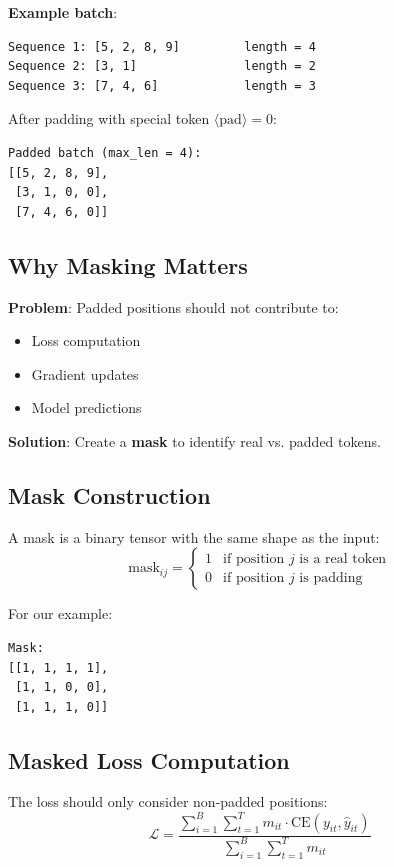 \documentclass{article}
\begin{document}
\textbf{Example batch}:
\begin{verbatim}
Sequence 1: [5, 2, 8, 9]         length = 4
Sequence 2: [3, 1]               length = 2
Sequence 3: [7, 4, 6]            length = 3
\end{verbatim}

After padding with special token $\langle \text{pad} \rangle = 0$:
\begin{verbatim}
Padded batch (max_len = 4):
[[5, 2, 8, 9],
 [3, 1, 0, 0],
 [7, 4, 6, 0]]
\end{verbatim}

\subsection{Why Masking Matters}

\textbf{Problem}: Padded positions should not contribute to:
\begin{itemize}
\item Loss computation
\item Gradient updates
\item Model predictions
\end{itemize}

\textbf{Solution}: Create a \textbf{mask} to identify real vs. padded tokens.

\subsection{Mask Construction}

A mask is a binary tensor with the same shape as the input:
\[
\text{mask}_{ij} = \begin{cases}
1 & \text{if position } j \text{ is a real token} \\
0 & \text{if position } j \text{ is padding}
\end{cases}
\]

For our example:
\begin{verbatim}
Mask:
[[1, 1, 1, 1],
 [1, 1, 0, 0],
 [1, 1, 1, 0]]
\end{verbatim}

\subsection{Masked Loss Computation}

The loss should only consider non-padded positions:
\[
\mathcal{L} = \frac{\sum_{i=1}^{B} \sum_{t=1}^{T} m_{it} \cdot \text{CE}(y_{it}, \hat{y}_{it})}{\sum_{i=1}^{B} \sum_{t=1}^{T} m_{it}}
\]
\end{document}
